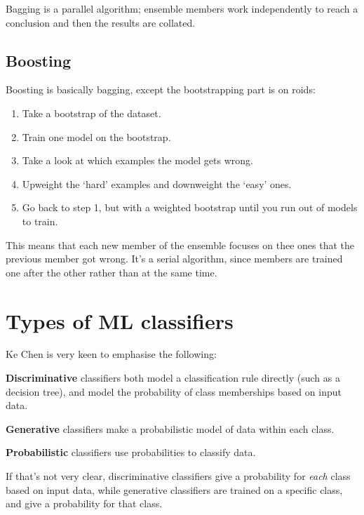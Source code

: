 Bagging is a parallel algorithm; ensemble members work independently to reach a
conclusion and then the results are collated.

\subsection{Boosting}

Boosting is basically bagging, except the bootstrapping part is on roids:

\begin{enumerate}
  \item Take a bootstrap of the dataset.
  \item Train one model on the bootstrap.
  \item Take a look at which examples the model gets wrong.
  \item Upweight the `hard' examples and downweight the `easy' ones.
  \item Go back to step 1, but with a weighted bootstrap until you run out of
    models to train.
\end{enumerate}

This means that each new member of the ensemble focuses on thee ones that the
previous member got wrong. It's a serial algorithm, since members are trained
one after the other rather than at the same time.

\section{Types of ML classifiers}

Ke Chen is very keen to emphasise the following:

\begin{description}
  \item \textbf{Discriminative} classifiers both model a classification rule
    directly (such as a decision tree), and model the probability of class
    memberships based on input data.
  \item \textbf{Generative} classifiers make a probabilistic model of data
    within each class.
  \item \textbf{Probabilistic} classifiers use probabilities to classify data.
\end{description}

If that's not very clear, discriminative classifiers give a probability for
\textit{each} class based on input data, while generative classifiers are
trained on a specific class, and give a probability for that class.

